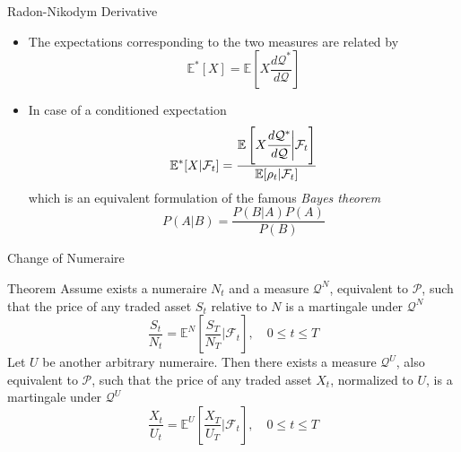 \documentclass{beamer}
\begin{document}
\begin{frame}{Radon-Nikodym Derivative}
\begin{itemize}
	\item The expectations corresponding to the two measures are related by
	\begin{equation*}
		\mathbb{E}^*[X] = \mathbb{E}\left[X\frac{d\mathcal{Q}^*}{d\mathcal{Q}}\right]
	\end{equation*}
	\item In case of a conditioned expectation
	\begin{equation}
		\mathbb{E}^*[X|\mathcal{F}_t] = \frac{\mathbb{E}\left[X\cfrac{d\mathcal{Q}^*}{d\mathcal{Q}}\bigg|\mathcal{F}_t\right]}{\mathbb{E}[\rho_t|\mathcal{F}_t]}
		\label{eq:conditioned_expectation}
	\end{equation}
	which is an equivalent formulation of the famous \emph{Bayes theorem}
 	\begin{equation*}
		P(A|B)=\frac{P(B|A)P(A)}{P(B)}
	\end{equation*}
\end{itemize}
\end{frame}

\begin{frame}{Change of Numeraire}
	\begin{block}{Theorem}
	Assume exists a numeraire $N_t$ and a measure $\mathcal{Q}^N$, equivalent to $\mathcal{P}$, such that the price of any traded asset $S_t$ relative to $N$ is a martingale under $\mathcal{Q}^N$
	\begin{equation*}
		\frac{S_t}{N_t} = \mathbb{E}^N\left[\frac{S_T}{N_T}\bigg|\mathcal{F}_t\right],\quad 0\le t \le T
	\end{equation*}
	Let $U$ be another arbitrary numeraire. Then there exists a measure $\mathcal{Q}^U$, also equivalent to $\mathcal{P}$, such that the price of any traded asset $X_t$, normalized to $U$, is a martingale under $\mathcal{Q}^U$
	\begin{equation*}
		\frac{X_t}{U_t} = \mathbb{E}^U\left[\frac{X_T}{U_T}\bigg|\mathcal{F}_t\right],\quad 0\le t \le T
	\end{equation*}
	\end{block}
\end{frame}	
\end{document}
